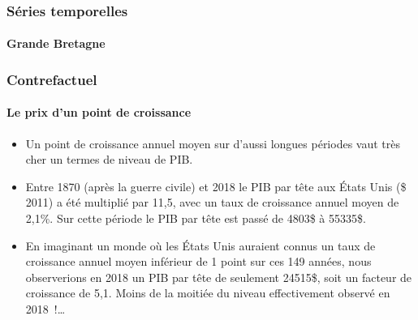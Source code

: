 \documentclass[10pt,notheorems]{beamer}
\theoremstyle{plain}
\theoremstyle{definition} %
\begin{document}
\begin{frame}
  \frametitle{Séries temporelles}
  \framesubtitle{Grande Bretagne}

  \begin{center}
    
  \end{center}

\end{frame}


\begin{frame}
  \frametitle{Contrefactuel}
  \framesubtitle{Le prix d'un point de croissance}

  \begin{itemize}

  \item Un point de croissance annuel moyen sur d'aussi longues périodes vaut très cher un termes de niveau de PIB.\newline

  \item Entre 1870 (après la guerre civile) et 2018 le PIB par tête aux États Unis (\$ 2011) a été multiplié par 11,5, avec un taux de croissance annuel moyen de 2,1\%. Sur cette période le PIB par tête est passé de  4803\$ à 55335\$.\newline

  \item En imaginant un monde où les États Unis auraient connus un taux de croissance annuel moyen inférieur de 1 point sur ces 149 années, nous observerions en 2018 un PIB par tête de seulement 24515\$, soit un facteur de croissance de 5,1. Moins de la moitiée du niveau effectivement observé en 2018~!\ldots\newline

  \end{itemize}

\end{frame}
\end{document}
